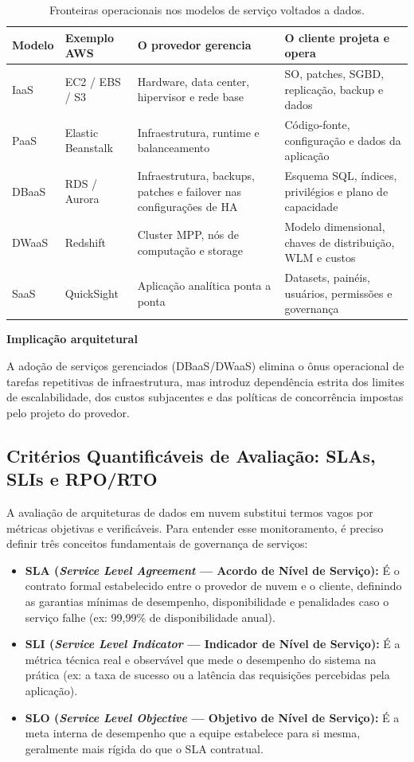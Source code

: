 \documentclass[11pt,a4paper]{article}
\newcommand{\destaque}[2]{\begin{center}\begin{minipage}{.96\textwidth}
  \colorbox{fundo}{\begin{minipage}{\dimexpr\linewidth-2\fboxsep}
  \textbf{\color{azul}#1}\par\small #2\end{minipage}}\end{minipage}\end{center}}
\begin{document}
\begin{table}[H]\centering\caption{Fronteiras operacionais nos modelos de serviço voltados a dados.}
\small\begin{tabularx}{\textwidth}{@{}p{1.6cm}p{2.6cm}Y Y@{}}\toprule
\textbf{Modelo} & \textbf{Exemplo AWS} & \textbf{O provedor gerencia} & \textbf{O cliente projeta e opera}\\\midrule
IaaS & EC2 / EBS / S3 & Hardware, data center, hipervisor e rede base & SO, patches, SGBD, replicação, backup e dados\\
PaaS & Elastic Beanstalk & Infraestrutura, runtime e balanceamento & Código-fonte, configuração e dados da aplicação\\
DBaaS & RDS / Aurora & Infraestrutura, backups, patches e failover nas configurações de HA & Esquema SQL, índices, privilégios e plano de capacidade\\
DWaaS & Redshift & Cluster MPP, nós de computação e storage & Modelo dimensional, chaves de distribuição, WLM e custos\\
SaaS & QuickSight & Aplicação analítica ponta a ponta & Datasets, painéis, usuários, permissões e governança\\\bottomrule
\end{tabularx}\end{table}

\destaque{Implicação arquitetural}{A adoção de serviços gerenciados (DBaaS/DWaaS) elimina o ônus operacional de tarefas repetitivas de infraestrutura, mas introduz dependência estrita dos limites de escalabilidade, dos custos subjacentes e das políticas de concorrência impostas pelo projeto do provedor.}

\subsection{Critérios Quantificáveis de Avaliação: SLAs, SLIs e RPO/RTO}

A avaliação de arquiteturas de dados em nuvem substitui termos vagos por métricas objetivas e verificáveis. Para entender esse monitoramento, é preciso definir três conceitos fundamentais de governança de serviços:
\begin{itemize}[leftmargin=*]
    \item \textbf{SLA (\emph{Service Level Agreement} --- Acordo de Nível de Serviço):} É o contrato formal estabelecido entre o provedor de nuvem e o cliente, definindo as garantias mínimas de desempenho, disponibilidade e penalidades caso o serviço falhe (ex: 99,99\% de disponibilidade anual).
    \item \textbf{SLI (\emph{Service Level Indicator} --- Indicador de Nível de Serviço):} É a métrica técnica real e observável que mede o desempenho do sistema na prática (ex: a taxa de sucesso ou a latência das requisições percebidas pela aplicação).
    \item \textbf{SLO (\emph{Service Level Objective} --- Objetivo de Nível de Serviço):} É a meta interna de desempenho que a equipe estabelece para si mesma, geralmente mais rígida do que o SLA contratual.
\end{itemize}
\end{document}
